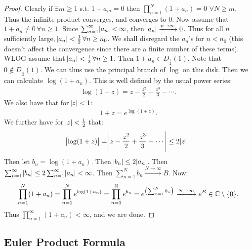 \begin{proof}
Clearly if $\exists m \geq 1 $ s.t. $1+a_m = 0$ then $\prod_{n=1}^N(1+a_n) = 0 \, \, \forall N\geq m$. Thus the infinite product converges, and converges to $0$. Now assume that $1+a_n \neq 0 \, \forall n \geq 1$. Since $\sum_{n=1}^\infty \abs{a_n} < \infty$, then $\abs{a_n} \xrightarrow[]{n\to \infty } 0$. Thus for all $n$ sufficiently large, $\abs{a_n} < \frac{1}{2}\, \forall n \geq n_0$. We shall disregard the $a_n$'s for $n < n_0$ (this doesn't affect the convergence since there are a finite number of these terms). WLOG assume that $\abs{a_n} < \frac{1}{2} \, \forall n \geq 1$. Then $1+a_n \in D_\frac{1}{2}(1)$. Note that $0 \not\in D_\frac{1}{2}(1)$. We can thus use the principal branch of $\log$ on this disk. Then we can calculate $\log(1+a_n)$. This is well defined by the usual power series:
\begin{align*}
    \log(1+z) = z - \frac{z^2}{2} + \frac{z^3}{3} - \cdots.
\end{align*}
We also have that for $\abs{z}< 1$:
\begin{align*}
    1+z = e^{\log(1+z)}.
\end{align*}
We further have for $\abs{z} < \frac{1}{2}$ that:
\begin{align*}
    \abs{\log(1+z)} = \abs{z - \frac{z^2}{2} + \frac{z^3}{3} - \cdots} \leq  2 \abs{z}.
\end{align*}
Then let $b_n = \log(1+a_n)$. Then $\abs{b_n} \leq 2 \abs{a_n}$. Then $\sum_{n=1}^\infty \abs{b_n} \leq 2 \sum_{n=1}^\infty \abs{a_n} < \infty$. Then $\sum_{n=1}^N b_n \xrightarrow[]{N \to \infty} B$. Now:
\begin{align*}
    \prod_{n=1}^N (1+a_n) = \prod_{n=1}^N e^{\log(1+a_n)} = \prod_{n=1}^{\mathbb{N}} e^{b_n} = e^{ \left( \sum_{n=1}^N b_n \right)} \xrightarrow{N \to \infty} e^B \in \mathbb{C} \setminus \{0 \}.
\end{align*}
Thus $\prod_{n=1}^\infty (1+a_n) < \infty$, and we are done.



\end{proof}

\subsection{Euler Product Formula}

